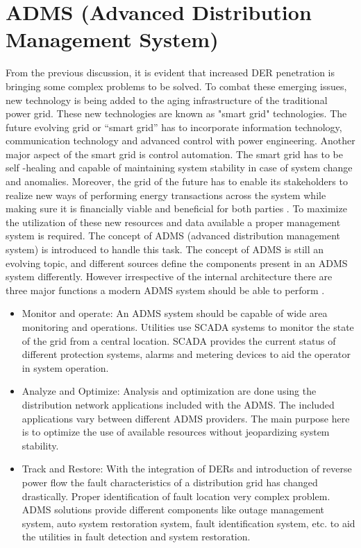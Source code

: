 \section{ADMS (Advanced Distribution Management System)}
From the previous discussion, it is evident that increased DER penetration is bringing some complex problems to be solved. To combat these emerging issues, new technology is being added to the aging infrastructure of the traditional power grid. These new technologies are known as "smart grid" technologies. The future evolving grid or “smart grid” has to incorporate information technology, communication technology and advanced control with power engineering. Another major aspect of the smart grid is control automation. The smart grid has to be self -healing and capable of maintaining system stability in case of system change and anomalies. Moreover, the grid of the future has to enable its stakeholders to realize new ways of performing energy transactions across the system while making sure it is financially viable and beneficial for both parties \cite{SG1}. To maximize the utilization of these new resources and data available a proper management system is required. The concept of ADMS (advanced distribution management system) is introduced to handle this task. The concept of ADMS is still an evolving topic, and different sources define the components present in an ADMS system differently. However irrespective of the internal architecture there are three major functions a modern ADMS system should be able to perform \cite{ADMS_1}.
\begin{itemize}
    \item Monitor and operate: An ADMS system should be capable of wide area monitoring and operations. Utilities use SCADA systems to monitor the state of the grid from a central location. SCADA provides the current status of different protection systems, alarms and metering devices to aid the operator in system operation.
    \item Analyze and Optimize: Analysis and optimization are done using the distribution network applications included with the ADMS. The included applications vary between different ADMS providers. The main purpose here is to optimize the use of available resources without jeopardizing system stability.
    \item Track and Restore: With the integration of DERs and introduction of reverse power flow the fault characteristics of a distribution grid has changed drastically. Proper identification of fault location very complex problem. ADMS solutions provide different components like outage management system, auto system restoration system, fault identification system, etc. to aid the utilities in fault detection and system restoration.
\end{itemize}
